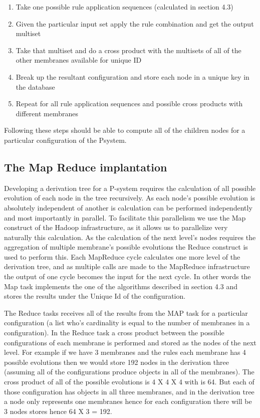 \documentclass[runningheads]{llncs}
\begin{document}
\begin{enumerate}
  \item Take one possible rule application sequences (calculated in section 4.3)
  \item Given the particular input set apply the rule combination and get the output multiset
  \item Take that multiset and do a cross product with the multisets of all of the other membranes available for unique ID
  \item Break up the resultant configuration and store each node in a unique key in the database
  \item Repeat for all rule application sequences and possible cross products with different membranes   
\end{enumerate}

Following these steps should be able to compute all of the children nodes for a particular configuration of the Psystem. 

\subsection{The Map Reduce implantation}

Developing a derivation tree for a P-system requires the calculation of all possible evolution of each node in the tree recursively. As each node's possible evolution is absolutely independent of another is calculation can be performed independently and most importantly in parallel. To facilitate this parallelism we use the Map construct of the Hadoop infrastructure, as it allows us to parallelize very naturally this calculation. As the calculation of the next level's nodes requires the aggregation of multiple membrane's possible evolutions the Reduce construct is used to perform this. Each MapReduce cycle calculates one more level of the derivation tree, and as multiple calls are made to the MapReduce infrastructure the output of one cycle becomes the input for the next cycle. In other words the Map task implements the one of the algorithms described in section 4.3 and stores the results under the Unique Id of the configuration.

The Reduce tasks receives all of the results from the MAP task for a particular configuration (a list who's cardinality is equal to the number of membranes in a configuration). In the Reduce task a cross product between the possible configurations of each membrane  is performed and stored as the nodes of the next level. For example if we have 3 membranes and the rules each membrane has 4 possible evolutions then we would store 192 nodes in the derivation three (assuming all of the configurations produce objects in all of the membranes). The cross product of all of the possible evolutions is 4 X 4 X 4 with is 64. But each of those configuration has objects in all three membranes, and in the derivation tree a node only represents one membranes hence for each configuration there will be 3 nodes stores hence 64 X 3 = 192. 
\end{document}
